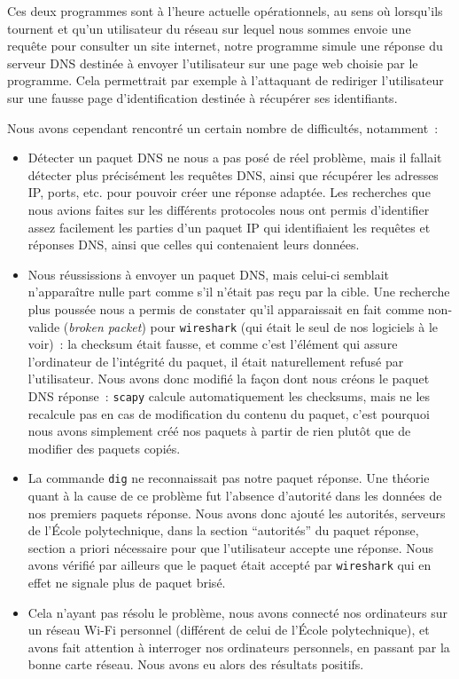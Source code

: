 \documentclass[a4paper, 12pt,twoside]{article}
\begin{document}
            Ces deux programmes sont à l'heure actuelle opérationnels, au sens où lorsqu'ils tournent et qu'un utilisateur du réseau sur lequel nous sommes envoie une requête pour consulter un site internet, notre programme simule une réponse du serveur DNS destinée à envoyer l'utilisateur sur une page web choisie par le programme. Cela permettrait par exemple à l'attaquant de rediriger l'utilisateur sur une fausse page d'identification destinée à récupérer ses identifiants.

            \noindent Nous avons cependant rencontré un certain nombre de difficultés, notamment~:
            \begin{itemize}[label=\color{bleu303}\textbullet{}]
                \item Détecter un paquet DNS ne nous a pas posé de réel problème, mais il fallait détecter plus précisément les requêtes DNS, ainsi que récupérer les adresses IP, ports, etc. pour pouvoir créer une réponse adaptée. Les recherches que nous avions faites sur les différents protocoles nous ont permis d'identifier assez facilement les parties d'un paquet IP qui identifiaient les requêtes et réponses DNS, ainsi que celles qui contenaient leurs données.
                \item Nous réussissions à envoyer un paquet DNS, mais celui-ci semblait n'apparaître nulle part comme s'il n'était pas reçu par la cible. Une recherche plus poussée nous a permis de constater qu'il apparaissait en fait comme non-valide (\emph{broken packet}) pour \verb!wireshark! (qui était le seul de nos logiciels à le voir)~: la checksum était fausse, et comme c'est l'élément qui assure l'ordinateur de l'intégrité du paquet, il était naturellement refusé par l'utilisateur. Nous avons donc modifié la façon dont nous créons le paquet DNS réponse~: \verb!scapy! calcule automatiquement les checksums, mais ne les recalcule pas en cas de modification du contenu du paquet, c'est pourquoi nous avons simplement créé nos paquets à partir de rien plutôt que de modifier des paquets copiés.
                \item La commande \verb!dig! ne reconnaissait pas notre paquet réponse. Une théorie quant à la cause de ce problème fut l'absence d'autorité dans les données de nos premiers paquets réponse. Nous avons donc ajouté les autorités, serveurs de l'École polytechnique, dans la section “autorités” du paquet réponse, section a priori nécessaire pour que l'utilisateur accepte une réponse. Nous avons vérifié par ailleurs que le paquet était accepté par \verb!wireshark! qui en effet ne signale plus de paquet brisé.
                \item Cela n'ayant pas résolu le problème, nous avons connecté nos ordinateurs sur un réseau Wi-Fi personnel (différent de celui de l'École polytechnique), et avons fait attention à interroger nos ordinateurs personnels, en passant par la bonne carte réseau. Nous avons eu alors des résultats positifs.


\end{itemize}
\end{document}
